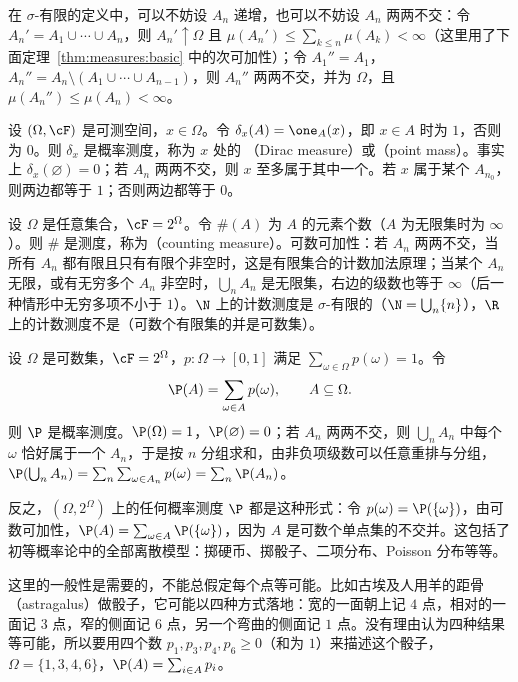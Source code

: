 在 $\sigma$-有限的定义中，可以不妨设 $A_n$ 递增，也可以不妨设 $A_n$ 两两不交：令 $A_n'=A_1\cup\cdots\cup A_n$，则 $A_n'\uparrow\Omega$ 且 $\mu(A_n')\leqslant\sum_{k\leqslant n}\mu(A_k)<\infty$（这里用了下面定理~\ref{thm:measures:basic} 中的次可加性）；令 $A_1''=A_1$，$A_n''=A_n\setminus(A_1\cup\cdots\cup A_{n-1})$，则 $A_n''$ 两两不交，并为 $\Omega$，且 $\mu(A_n'')\leqslant\mu(A_n)<\infty$。

\begin{example}[Dirac 测度]\label{ex:measures:dirac}
设 $(\Omega,\cF)$ 是可测空间，$x\in\Omega$。令 $\delta_x(A)=\one_A(x)$，即 $x\in A$ 时为 $1$，否则为 $0$。则 $\delta_x$ 是概率测度，称为 $x$ 处的 （Dirac measure）或（point mass）。事实上 $\delta_x(\varnothing)=0$；若 $A_n$ 两两不交，则 $x$ 至多属于其中一个。若 $x$ 属于某个 $A_{n_0}$，则两边都等于 $1$；否则两边都等于 $0$。
\end{example}

\begin{example}[计数测度]\label{ex:measures:counting}
设 $\Omega$ 是任意集合，$\cF=2^\Omega$。令 $\#(A)$ 为 $A$ 的元素个数（$A$ 为无限集时为 $\infty$）。则 $\#$ 是测度，称为（counting measure）。可数可加性：若 $A_n$ 两两不交，当所有 $A_n$ 都有限且只有有限个非空时，这是有限集合的计数加法原理；当某个 $A_n$ 无限，或有无穷多个 $A_n$ 非空时，$\bigcup_nA_n$ 是无限集，右边的级数也等于 $\infty$（后一种情形中无穷多项不小于 $1$）。$\N$ 上的计数测度是 $\sigma$-有限的（$\N=\bigcup_n\{n\}$），$\R$ 上的计数测度不是（可数个有限集的并是可数集）。
\end{example}

\begin{example}[离散概率空间]\label{ex:measures:discrete}
设 $\Omega$ 是可数集，$\cF=2^\Omega$，$p:\Omega\to[0,1]$ 满足 $\sum_{\omega\in\Omega}p(\omega)=1$。令
\[
\P(A)=\sum_{\omega\in A}p(\omega),\qquad A\subseteq\Omega.
\]
则 $\P$ 是概率测度。$\P(\Omega)=1$，$\P(\varnothing)=0$；若 $A_n$ 两两不交，则 $\bigcup_nA_n$ 中每个 $\omega$ 恰好属于一个 $A_n$，于是按 $n$ 分组求和，由非负项级数可以任意重排与分组，$\P(\bigcup_nA_n)=\sum_n\sum_{\omega\in A_n}p(\omega)=\sum_n\P(A_n)$。

反之，$(\Omega,2^\Omega)$ 上的任何概率测度 $\P$ 都是这种形式：令 $p(\omega)=\P(\{\omega\})$，由可数可加性，$\P(A)=\sum_{\omega\in A}\P(\{\omega\})$，因为 $A$ 是可数个单点集的不交并。这包括了初等概率论中的全部离散模型：掷硬币、掷骰子、二项分布、Poisson 分布等等。

这里的一般性是需要的，不能总假定每个点等可能。比如古埃及人用羊的距骨（astragalus）做骰子，它可能以四种方式落地：宽的一面朝上记 $4$ 点，相对的一面记 $3$ 点，窄的侧面记 $6$ 点，另一个弯曲的侧面记 $1$ 点。没有理由认为四种结果等可能，所以要用四个数 $p_1,p_3,p_4,p_6\geqslant0$（和为 $1$）来描述这个骰子，$\Omega=\{1,3,4,6\}$，$\P(A)=\sum_{i\in A}p_i$。
\end{example}

